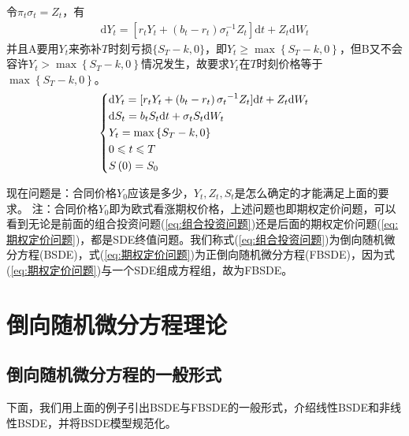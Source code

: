 		令${\pi _t}{\sigma _t} = {Z_t}$，有
		\begin{align*}
			{\mathrm{d}}Y_t =[ {{r_t}{Y_t} +( {{b_t} - {r_t}})\sigma _t^{ - 1}{Z_t}}]{\mathrm{d}}t + Z_t{\mathrm{d}}W_t
		\end{align*}
		并且A要用$Y_t$来弥补$T$时刻亏损$\{{{S_T}-k},0\}$，即${Y_t}\geqslant \max \left\{ {{S_T} - k,0} \right\}$，但B又不会容许${Y_t} > \max \left\{ {{S_T} - k,0} \right\}$情况发生，故要求$Y_t$在$T$时刻价格等于$\max \left\{ {{S_T} - k,0} \right\}$。
		\begin{align}\label{eq:期权定价问题}
			\centering
			\left\{
			\begin{lgathered}
			{\mathrm{d}{Y_t} = [{r_t}{Y_t} + \left( {{b_t} - {r_t}} \right){\sigma _t}^{-1} {Z_t}]{\mathrm{d}t} + {Z_t}\mathrm{d}{W_t}}\\
			{\mathrm{d}{S_t} = {b_t}{S_t}\mathrm{d}t + {\sigma _t}{S_t}\mathrm{d}{W_t}}\\
			{{Y_t} = \max \left\{ {{S_T} - k,0} \right\}}\\
			{0 \leqslant t \leqslant T}\\
			{S\left( 0 \right) = {S_0}}
			\end{lgathered}
			 \right.
		\end{align}
		\par
		现在问题是：合同价格$Y_0$应该是多少，$Y_t,Z_t,S_t$是怎么确定的才能满足上面的要求。
		注：合同价格$Y_0$即为欧式看涨期权价格，上述问题也即期权定价问题，可以看到无论是前面的组合投资问题(\ref{eq:组合投资问题})还是后面的期权定价问题(\ref{eq:期权定价问题})，都是SDE终值问题。我们称式(\ref{eq:组合投资问题})为倒向随机微分方程(BSDE)，式(\ref{eq:期权定价问题})为正倒向随机微分方程(FBSDE)，因为式(\ref{eq:期权定价问题})与一个SDE组成方程组，故为FBSDE。

\section{倒向随机微分方程理论}

	\subsection{倒向随机微分方程的一般形式}
		下面，我们用上面的例子引出BSDE与FBSDE的一般形式，介绍线性BSDE和非线性BSDE，并将BSDE模型规范化。
